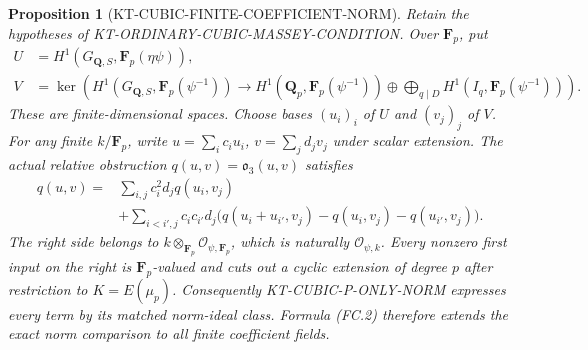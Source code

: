 \documentclass[11pt,a4paper]{article}
\newtheorem{proposition}[theorem]{Proposition}
\theoremstyle{definition}
\begin{document}
\begin{proposition}[KT-CUBIC-FINITE-COEFFICIENT-NORM]
Retain the hypotheses of KT-ORDINARY-CUBIC-MASSEY-CONDITION.
Over \(\mathbf F_p\), put
\[
\begin{split}
 U&=H^1(G_{\mathbf Q,S},\mathbf F_p(\eta\psi)),\\
 V&=\ker\left(H^1(G_{\mathbf Q,S},\mathbf F_p(\psi^{-1}))
       \longrightarrow H^1(\mathbf Q_p,\mathbf F_p(\psi^{-1}))
           \oplus\bigoplus_{q\mid D}H^1(I_q,\mathbf F_p(\psi^{-1}))
         \right).
\end{split}                                               \tag{FC.1}
\]
These are finite-dimensional spaces.  Choose bases
\((u_i)_i\) of \(U\) and \((v_j)_j\) of \(V\).
For any finite \(k/\mathbf F_p\), write
\(u=\sum_i c_i u_i\), \(v=\sum_j d_jv_j\)
under scalar extension.  The actual relative obstruction
\(q(u,v)=\mathfrak o_3(u,v)\) satisfies
\[
\begin{split}
q(u,v)={}&\sum_{i,j}c_i^2d_jq(u_i,v_j)\\
 &+\sum_{i<i',j}c_ic_{i'}d_j
     \bigl(q(u_i+u_{i'},v_j)-q(u_i,v_j)-q(u_{i'},v_j)\bigr).
\end{split}                                               \tag{FC.2}
\]
The right side belongs to
\(k\otimes_{\mathbf F_p}\mathcal O_{\psi,\mathbf F_p}\),
which is naturally \(\mathcal O_{\psi,k}\).
Every nonzero first input on the right is
\(\mathbf F_p\)-valued and cuts out a cyclic extension
of degree \(p\) after restriction to \(K=E(\mu_p)\).
Consequently KT-CUBIC-P-ONLY-NORM expresses every term
by its matched norm-ideal class.  Formula (FC.2)
therefore extends the exact norm comparison to all
finite coefficient fields.
\end{proposition}
\end{document}
